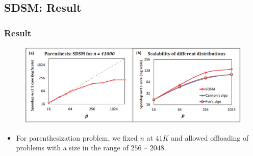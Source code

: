 \subsection{SDSM: Result}
\begin{frame}
    \frametitle{Result}
    \begin{figure}
		\includegraphics[scale=0.3]{figure/fig-distributed-result.png}
	\end{figure}
    \begin{itemize}
    	\item For parenthesization problem, we fixed $n$ at $41 K$ and 
    		allowed offloading of problems with a size in the range of
    		$256$ -- $2048$.
    \end{itemize}
\end{frame}